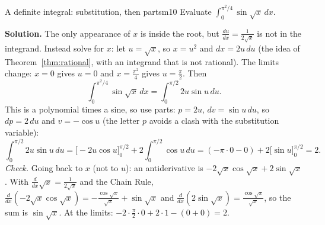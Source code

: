 \documentclass[11pt]{article}
\begin{document}
\begin{exmp}{A definite integral: substitution, then parts}{m10}
Evaluate $\displaystyle\int_0^{\pi^2/4}\sin\sqrt x\,dx$.

\textbf{Solution.} The only appearance of $x$ is inside the root, but $\frac{du}{dx}=\frac1{2\sqrt x}$ is not in the integrand. Instead solve for $x$: let $u=\sqrt x$, so $x=u^2$ and $dx=2u\,du$ (the idea of Theorem~\ref{thm:rational}, with an integrand that is not rational). The limits change: $x=0$ gives $u=0$ and $x=\frac{\pi^2}4$ gives $u=\frac\pi2$. Then
\[\int_0^{\pi^2/4}\sin\sqrt x\,dx=\int_0^{\pi/2}2u\sin u\,du .\]
This is a polynomial times a sine, so use parts: $p=2u$, $dv=\sin u\,du$, so $dp=2\,du$ and $v=-\cos u$ (the letter $p$ avoids a clash with the substitution variable):
\[\int_0^{\pi/2}2u\sin u\,du=\Big[-2u\cos u\Big]_0^{\pi/2}+2\int_0^{\pi/2}\cos u\,du=\left(-\pi\cdot0-0\right)+2\Big[\sin u\Big]_0^{\pi/2}=2 .\]
\emph{Check.} Going back to $x$ (not to $u$): an antiderivative is $-2\sqrt x\cos\sqrt x+2\sin\sqrt x$. With $\frac d{dx}\sqrt x=\frac1{2\sqrt x}$ and the Chain Rule, $\frac d{dx}\left(-2\sqrt x\cos\sqrt x\right)=-\frac{\cos\sqrt x}{\sqrt x}+\sin\sqrt x$ and $\frac d{dx}\left(2\sin\sqrt x\right)=\frac{\cos\sqrt x}{\sqrt x}$, so the sum is $\sin\sqrt x$. At the limits: $-2\cdot\frac\pi2\cdot0+2\cdot1-(0+0)=2$.


\end{exmp}
\end{document}
